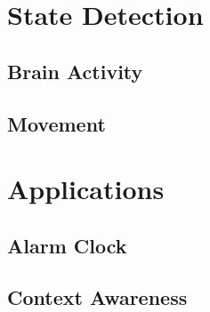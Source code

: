 
\section{State Detection} %
\label{sec:state_detection}

\subsection{Brain Activity} %
\label{sub:brain_activity}


\subsection{Movement} %
\label{sub:movement}



\section{Applications} %
\label{sec:applications}

\subsection{Alarm Clock} %
\label{sub:alarm_clock}


\subsection{Context Awareness} %
\label{sub:context_awareness}



